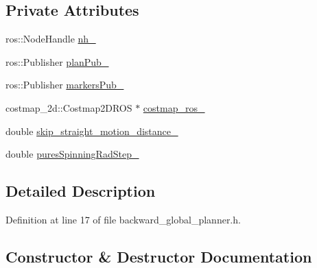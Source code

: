 \subsection*{Private Attributes}
\begin{DoxyCompactItemize}
\item 
ros\+::\+Node\+Handle \hyperlink{classcl__move__base__z_1_1backward__global__planner_1_1BackwardGlobalPlanner_adeb0df38d8dcde919b732724420a401f}{nh\+\_\+}
\item 
ros\+::\+Publisher \hyperlink{classcl__move__base__z_1_1backward__global__planner_1_1BackwardGlobalPlanner_a561eab039140948c52ec928c191f3f43}{plan\+Pub\+\_\+}
\item 
ros\+::\+Publisher \hyperlink{classcl__move__base__z_1_1backward__global__planner_1_1BackwardGlobalPlanner_a6f80f7041c8cdc93e1f3dfd0e723654a}{markers\+Pub\+\_\+}
\item 
costmap\+\_\+2d\+::\+Costmap2\+D\+R\+OS $\ast$ \hyperlink{classcl__move__base__z_1_1backward__global__planner_1_1BackwardGlobalPlanner_a7103c15e6540a514acd421c3c6e194a4}{costmap\+\_\+ros\+\_\+}
\item 
double \hyperlink{classcl__move__base__z_1_1backward__global__planner_1_1BackwardGlobalPlanner_a045290b931b816b84ced2cfb6c39fcce}{skip\+\_\+straight\+\_\+motion\+\_\+distance\+\_\+}
\item 
double \hyperlink{classcl__move__base__z_1_1backward__global__planner_1_1BackwardGlobalPlanner_a066d160f78bebee9fc5b5251016f1cd0}{pures\+Spinning\+Rad\+Step\+\_\+}
\end{DoxyCompactItemize}


\subsection{Detailed Description}


Definition at line 17 of file backward\+\_\+global\+\_\+planner.\+h.



\subsection{Constructor \& Destructor Documentation}
\mbox{\label{classcl__move__base__z_1_1backward__global__planner_1_1BackwardGlobalPlanner_a20888ea9b40dcbd86b8b12310a2ad60b}} 
